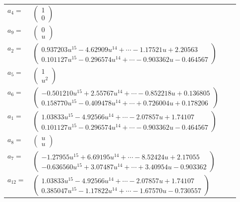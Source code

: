 \documentclass[1p]{elsarticle_modified}
\theoremstyle{definition}
\begin{document}
\begin{tabular}{m{7pt} m{180pt} m{7pt} m{180pt} }
\flushright $a_{4}=$&$\begin{pmatrix}1\\0\end{pmatrix}$ \\
\flushright $a_{9}=$&$\begin{pmatrix}0\\u\end{pmatrix}$ \\
\flushright $a_{2}=$&$\begin{pmatrix}0.937203 u^{15}-4.62909 u^{14}+\cdots-1.17521 u+2.20563\\0.101127 u^{15}-0.296574 u^{14}+\cdots-0.903362 u-0.464567\end{pmatrix}$ \\
\flushright $a_{5}=$&$\begin{pmatrix}1\\u^2\end{pmatrix}$ \\
\flushright $a_{6}=$&$\begin{pmatrix}-0.501210 u^{15}+2.55767 u^{14}+\cdots-0.852218 u+0.136805\\0.158770 u^{15}-0.409478 u^{14}+\cdots+0.726004 u+0.178206\end{pmatrix}$ \\
\flushright $a_{1}=$&$\begin{pmatrix}1.03833 u^{15}-4.92566 u^{14}+\cdots-2.07857 u+1.74107\\0.101127 u^{15}-0.296574 u^{14}+\cdots-0.903362 u-0.464567\end{pmatrix}$ \\
\flushright $a_{8}=$&$\begin{pmatrix}u\\u\end{pmatrix}$ \\
\flushright $a_{7}=$&$\begin{pmatrix}-1.27955 u^{15}+6.69195 u^{14}+\cdots-8.52424 u+2.17055\\-0.636560 u^{15}+3.07487 u^{14}+\cdots+3.40954 u-0.903362\end{pmatrix}$ \\
\flushright $a_{12}=$&$\begin{pmatrix}1.03833 u^{15}-4.92566 u^{14}+\cdots-2.07857 u+1.74107\\0.385047 u^{15}-1.17822 u^{14}+\cdots-1.67570 u-0.730557\end{pmatrix}$ \\

\end{tabular}
\end{document}
